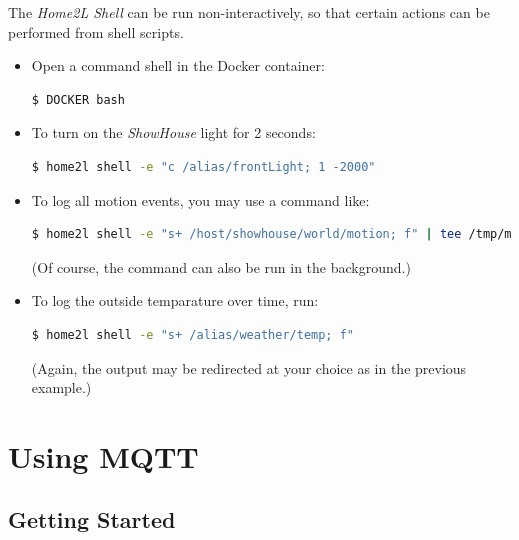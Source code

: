 \documentclass[12pt,english,parskip=half,headheight=19pt]{scrreprt}
\begin{document}
The \textit{Home2L Shell} can be run non-interactively, so that certain actions can be performed from shell scripts.

\begin{itemize}[$\blacktriangleright$]

\item
  Open a command shell in the Docker container:
  \begin{lstlisting}[language=bash]
    $ DOCKER bash
  \end{lstlisting}

\item
  To turn on the \textit{ShowHouse} light for 2 seconds:
  \begin{lstlisting}[language=bash]
    $ home2l shell -e "c /alias/frontLight; 1 -2000"
  \end{lstlisting}

\item
  To log all motion events, you may use a command like:
  \begin{lstlisting}[language=bash]
    $ home2l shell -e "s+ /host/showhouse/world/motion; f" | tee /tmp/motion.log
  \end{lstlisting}
  (Of course, the command can also be run in the background.)

\item
  To log the outside temparature over time, run:
  \begin{lstlisting}[language=bash]
    $ home2l shell -e "s+ /alias/weather/temp; f"
  \end{lstlisting}
  (Again, the output may be redirected at your choice as in the previous example.)

\end{itemize}





\clearpage
\section{Using MQTT}
\label{sec:tutorial-mqtt}



\subsection{Getting Started}
\label{sec:tutorial-mqtt-start}
\end{document}
